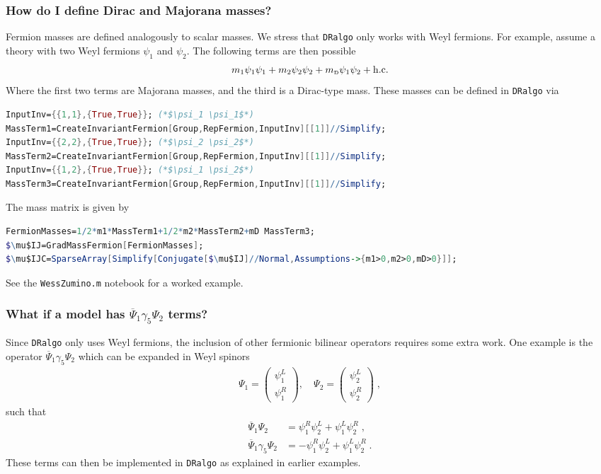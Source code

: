 \documentclass[11pt]{article}
\def\dralgo{{\tt DRalgo}}
\newcommand{\mD}{m_\rmii{D}}
\newcommand{\rmii}[1]{{\mbox{\tiny\rm{#1}}}}
\begin{document}
\subsubsection{How do I define Dirac and Majorana masses?}
Fermion masses are defined analogously to scalar masses.
We stress that \dralgo{} only works with Weyl fermions.
For example, assume a theory with
two Weyl fermions $\psi_1$ and $\psi_2$.
The following terms are then possible
\begin{align}
    m_1 \psi_1\psi_1
  + m_2 \psi_2\psi_2
  + \mD\psi_1\psi_2
  + \mathrm{h.c.}
\end{align}
Where the first two terms are Majorana masses, and the third is a Dirac-type mass. 
These masses can be defined in \dralgo{} via
\begin{lstlisting}[language=Mathematica,mathescape=true]
InputInv={{1,1},{True,True}}; (*$\psi_1 \psi_1$*)
MassTerm1=CreateInvariantFermion[Group,RepFermion,InputInv][[1]]//Simplify;
InputInv={{2,2},{True,True}}; (*$\psi_2 \psi_2$*)
MassTerm2=CreateInvariantFermion[Group,RepFermion,InputInv][[1]]//Simplify;
InputInv={{1,2},{True,True}}; (*$\psi_1 \psi_2$*)
MassTerm3=CreateInvariantFermion[Group,RepFermion,InputInv][[1]]//Simplify;
\end{lstlisting}
The mass matrix is given by
\begin{lstlisting}[language=Mathematica,mathescape=true]
FermionMasses=1/2*m1*MassTerm1+1/2*m2*MassTerm2+mD MassTerm3;
$\mu$IJ=GradMassFermion[FermionMasses];
$\mu$IJC=SparseArray[Simplify[Conjugate[$\mu$IJ]//Normal,Assumptions->{m1>0,m2>0,mD>0}]];
\end{lstlisting}
See the {\tt WessZumino.m} notebook for a worked example.

%
\subsubsection{What if a model has $\overline{\Psi}_1 \gamma_5\Psi_2$ terms?}

Since \dralgo{} only uses Weyl fermions,
the inclusion of other fermionic bilinear operators requires some extra work.
One example is the operator 
$\overline{\Psi}_1 \gamma_5\Psi_2$ which
can be expanded in Weyl spinors
\begin{align}
\Psi_1=\begin{pmatrix}
  \psi_1^L\\
  \psi_1^R
\end{pmatrix}, \quad
\Psi_2=\begin{pmatrix}
  \psi_2^L\\
  \psi_2^R
\end{pmatrix}
\;,
\end{align}
such that
\begin{align}
  \overline{\Psi}_1\Psi_2 &=
    \psi_1^R \psi_2^L
  + \psi_1^L \psi_2^R
  \;,\\
  \overline{\Psi}_1\gamma_5 \Psi_2 &=
  - \psi_1^R \psi_2^L
  + \psi_1^L \psi_2^R
  \;.
\end{align}
These terms can then be implemented in \dralgo{} as explained in earlier examples.
\end{document}
